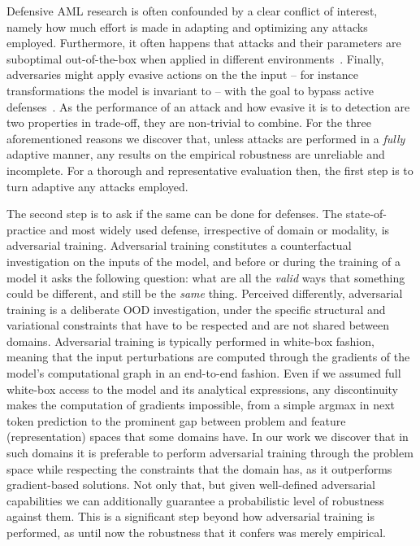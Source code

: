 Defensive \gls{AML} research is often confounded by a clear conflict of interest, namely how much effort is made in adapting and optimizing any attacks employed.
Furthermore, it often happens that attacks and their parameters are suboptimal out-of-the-box when applied in different environments~\cite{croce2020reliable}.
Finally, adversaries might apply evasive actions on the the input -- for instance transformations the model is invariant to -- with the goal to bypass active defenses~\cite{chen2020stateful,li2022blacklight}.
As the performance of an attack and how evasive it is to detection are two properties in trade-off, they are non-trivial to combine.
For the three aforementioned reasons we discover that, unless attacks are performed in a \textit{fully} adaptive manner, any results on the empirical robustness are unreliable and incomplete.
For a thorough and representative evaluation then, the first step is to turn adaptive any attacks employed.

The second step is to ask if the same can be done for defenses.
The state-of-practice and most widely used defense, irrespective of domain or modality, is adversarial training.
Adversarial training constitutes a counterfactual investigation on the inputs of the model, and before or during the training of a model it asks the following question: what are all the \textit{valid} ways that something could be different, and still be the \textit{same} thing.
Perceived differently, adversarial training is a deliberate \gls{OOD} investigation, under the specific structural and variational constraints that have to be respected and are not shared between domains.
Adversarial training is typically performed in white-box fashion, meaning that the input perturbations are computed through the gradients of the model's computational graph in an end-to-end fashion.
Even if we assumed full white-box access to the model and its analytical expressions, any discontinuity makes the computation of gradients impossible, from a simple argmax in next token prediction to the prominent gap between problem and feature (representation) spaces that some domains have.
In our work we discover that in such domains it is preferable to perform adversarial training through the problem space while respecting the constraints that the domain has, as it outperforms gradient-based solutions.
Not only that, but given well-defined adversarial capabilities we can additionally guarantee a probabilistic level of robustness against them.
This is a significant step beyond how adversarial training is performed, as until now the robustness that it confers was merely empirical.

